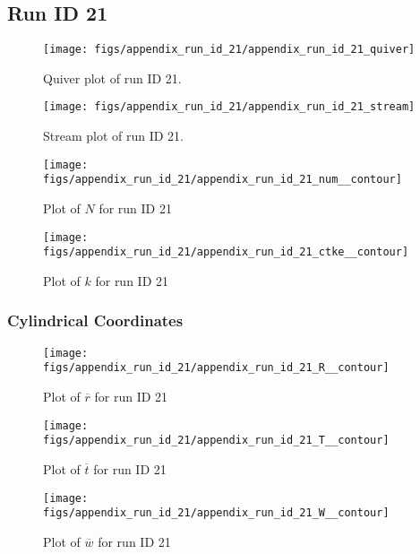 \subsection{Run ID 21}
\begin{figure}[H]
\centering
\texttt{[image: figs/appendix\_run\_id\_21/appendix\_run\_id\_21\_quiver]}
\caption{Quiver plot of run ID 21.}
\label{fig:appendix_run_id_21_quiver}
\end{figure}


\begin{figure}[H]
\centering
\texttt{[image: figs/appendix\_run\_id\_21/appendix\_run\_id\_21\_stream]}
\caption{Stream plot of run ID 21.}
\label{fig:appendix_run_id_21_stream}
\end{figure}


\begin{figure}[H]
\centering
\texttt{[image: figs/appendix\_run\_id\_21/appendix\_run\_id\_21\_num\_\_contour]}
\caption{Plot of $N$ for run ID 21}
\label{fig:appendix_run_id_21_num__contour}
\end{figure}


\begin{figure}[H]
\centering
\texttt{[image: figs/appendix\_run\_id\_21/appendix\_run\_id\_21\_ctke\_\_contour]}
\caption{Plot of $k$ for run ID 21}
\label{fig:appendix_run_id_21_ctke__contour}
\end{figure}


\subsubsection{Cylindrical Coordinates}
\begin{figure}[H]
\centering
\texttt{[image: figs/appendix\_run\_id\_21/appendix\_run\_id\_21\_R\_\_contour]}
\caption{Plot of $\overline{r}$ for run ID 21}
\label{fig:appendix_run_id_21_R__contour}
\end{figure}


\begin{figure}[H]
\centering
\texttt{[image: figs/appendix\_run\_id\_21/appendix\_run\_id\_21\_T\_\_contour]}
\caption{Plot of $\overline{t}$ for run ID 21}
\label{fig:appendix_run_id_21_T__contour}
\end{figure}


\begin{figure}[H]
\centering
\texttt{[image: figs/appendix\_run\_id\_21/appendix\_run\_id\_21\_W\_\_contour]}
\caption{Plot of $\overline{w}$ for run ID 21}
\label{fig:appendix_run_id_21_W__contour}
\end{figure}


